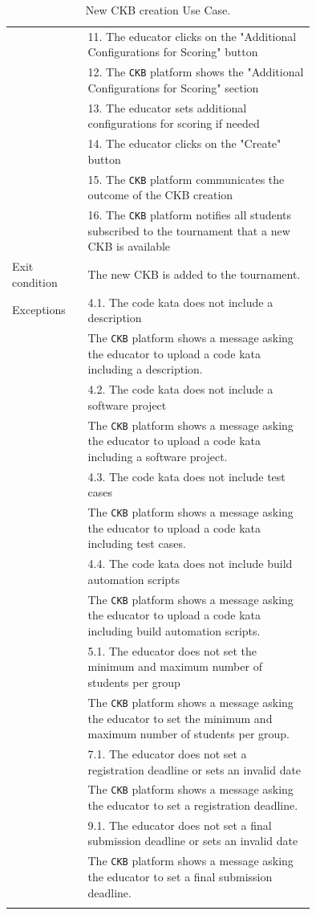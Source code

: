 \begin{center}
\begin{longtable}{lp{0.75\linewidth}}
        & 11. The educator clicks on the "Additional Configurations for Scoring" button\\
        & 12. The \verb|CKB| platform shows the "Additional Configurations for Scoring" section\\
        & 13. The educator sets additional configurations for scoring if needed\\
        & 14. The educator clicks on the "Create" button\\
        & 15. The \verb|CKB| platform communicates the outcome of the CKB creation\\
        & 16. The \verb|CKB| platform notifies all students subscribed to the tournament that a new CKB is available\\
        \hline
        Exit condition   & The new CKB is added to the tournament.   \\                                                                                                                                                                         
        \hline
        Exceptions   
        & 4.1. The code kata does not include a description\\
            & The \verb|CKB| platform shows a message asking the educator to upload a code kata including a description.  \\
        & 4.2. The code kata does not include a software project\\
            & The \verb|CKB| platform shows a message asking the educator to upload a code kata including a software project.  \\
        & 4.3. The code kata does not include test cases\\
            & The \verb|CKB| platform shows a message asking the educator to upload a code kata including test cases.  \\
        & 4.4. The code kata does not include build automation scripts\\
            & The \verb|CKB| platform shows a message asking the educator to upload a code kata including build automation scripts.  \\
        & 5.1. The educator does not set the minimum and maximum number of students per group\\
            & The \verb|CKB| platform shows a message asking the educator to set the minimum and maximum number of students per group.  \\
        & 7.1. The educator does not set a registration deadline or sets an invalid date\\
            & The \verb|CKB| platform shows a message asking the educator to set a registration deadline.  \\
        & 9.1. The educator does not set a final submission deadline or sets an invalid date\\
            & The \verb|CKB| platform shows a message asking the educator to set a final submission deadline.  \\
        \hline
        \caption{New CKB creation Use Case.}
        \label{tab: new_CKB_use_case}
    \end{longtable}


\end{center}
